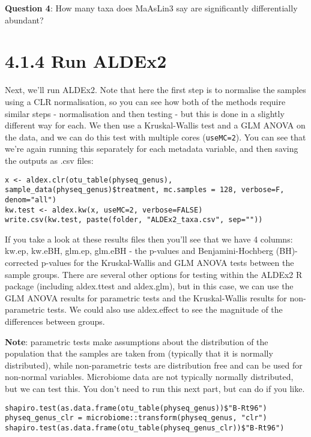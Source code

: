 \documentclass[
]{book}
\begin{document}
\textbf{Question 4}: How many taxa does MaAsLin3 say are significantly differentially abundant?

\section{4.1.4 Run ALDEx2}\label{run-aldex2}

Next, we'll run ALDEx2. Note that here the first step is to normalise the samples using a CLR normalisation, so you can see how both of the methods require similar steps - normalisation and then testing - but this is done in a slightly different way for each. We then use a Kruskal-Wallis test and a GLM ANOVA on the data, and we can do this test with multiple cores (\texttt{useMC=2}). You can see that we're again running this separately for each metadata variable, and then saving the outputs as .csv files:

\begin{verbatim}
x <- aldex.clr(otu_table(physeq_genus), sample_data(physeq_genus)$treatment, mc.samples = 128, verbose=F, denom="all")
kw.test <- aldex.kw(x, useMC=2, verbose=FALSE)
write.csv(kw.test, paste(folder, "ALDEx2_taxa.csv", sep=""))
\end{verbatim}

If you take a look at these results files then you'll see that we have 4 columns: kw.ep, kw.eBH, glm.ep, glm.eBH - the p-values and Benjamini-Hochberg (BH)-corrected p-values for the Kruskal-Wallis and GLM ANOVA tests between the sample groups. There are several other options for testing within the ALDEx2 R package (including aldex.ttest and aldex.glm), but in this case, we can use the GLM ANOVA results for parametric tests and the Kruskal-Wallis results for non-parametric tests. We could also use aldex.effect to see the magnitude of the differences between groups.

\textbf{Note}: parametric tests make assumptions about the distribution of the population that the samples are taken from (typically that it is normally distributed), while non-parametric tests are distribution free and can be used for non-normal variables. Microbiome data are not typically normally distributed, but we can test this. You don't need to run this next part, but can do if you like.

\begin{verbatim}
shapiro.test(as.data.frame(otu_table(physeq_genus))$"B-Rt96")
physeq_genus_clr = microbiome::transform(physeq_genus, "clr")
shapiro.test(as.data.frame(otu_table(physeq_genus_clr))$"B-Rt96")
\end{verbatim}
\end{document}
